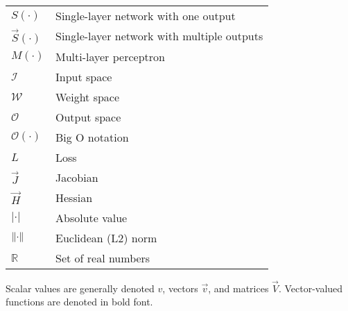 \begin{table}[h!]
\begin{tabular}{l|l}
        $S(\cdot)$ & Single-layer network with one output \\
        $\vec{S}(\cdot)$ & Single-layer network with multiple outputs \\
        $M(\cdot)$ & Multi-layer perceptron \\
        $\mathcal{I}$ & Input space \\
        $\mathcal{W}$ & Weight space \\
        $\mathcal{O}$ & Output space \\
        $\mathcal{O}(\cdot)$ & Big O notation \\
        $L$ & Loss \\
        $\vec{J}$ & Jacobian \\
        $\vec{H}$ & Hessian \\
        $|\cdot|$ & Absolute value \\
        $\left\lVert\cdot\right\rVert$ & Euclidean (L2) norm \\
        $\mathbb{R}$ & Set of real numbers
    \end{tabular}
\end{table}

\noindent
Scalar values are generally denoted $v$, vectors $\vec{v}$, and matrices $\vec{V}$.
Vector-valued functions are denoted in bold font.